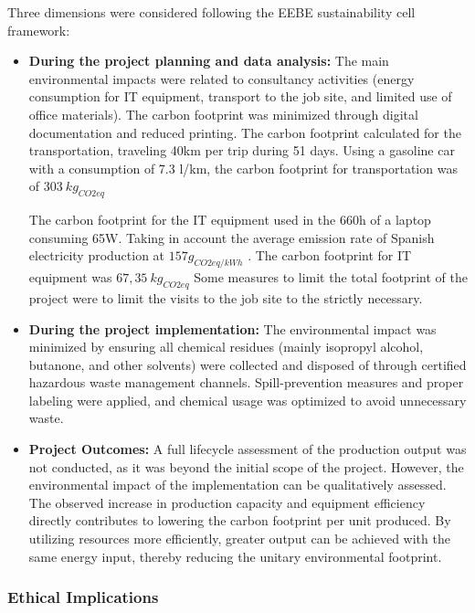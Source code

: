 \documentclass[]{article}
\begin{document}
Three dimensions were considered following the EEBE sustainability cell framework:

\begin{itemize}
    \item \textbf{During the project planning and data analysis:} The main environmental impacts were related to consultancy activities (energy consumption for IT equipment, transport to the job site, and limited use of office materials). The carbon footprint was minimized through digital documentation and reduced printing.
      \subitem The carbon footprint calculated for the transportation, traveling 40km per trip during 51 days. Using a gasoline car with a consumption of 7.3 l/km, the carbon footprint for transportation was of $303\ kg_{CO2 eq}$

      \subitem The carbon footprint for the IT equipment used in the 660h of a laptop consuming 65W.
      Taking in account the average emission rate of Spanish electricity production at $157 g_{CO2 eq/kWh}$ \cite{electricitymaps_spain_nodate}.
      The carbon footprint for IT equipment was $67,35\ kg_{CO2 eq}$ 
      Some measures to limit the total footprint of the project were to limit the visits to the job site to the strictly necessary.


    \item \textbf{During the project implementation:} The environmental impact was minimized by ensuring all chemical residues (mainly isopropyl alcohol, butanone, and other solvents) were collected and disposed of through certified hazardous waste management channels. Spill-prevention measures and proper labeling were applied, and chemical usage was optimized to avoid unnecessary waste.

    \item \textbf{Project Outcomes:} A full lifecycle assessment of the production output was not conducted, as it was beyond the initial scope of the project. However, the environmental impact of the implementation can be qualitatively assessed. The observed increase in production capacity and equipment efficiency directly contributes to lowering the carbon footprint per unit produced. By utilizing resources more efficiently, greater output can be achieved with the same energy input, thereby reducing the unitary environmental footprint.
  \end{itemize}


\subsubsection{Ethical Implications}
\end{document}
